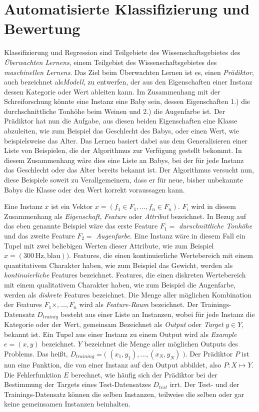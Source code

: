 \section{Automatisierte Klassifizierung und Bewertung}
\label{sec:learning}

Klassifizierung und Regression sind Teilgebiete des Wissenschaftsgebietes des \emph{Überwachten Lernens}, einem Teilgebiet des Wissenschaftsgebietes des \emph{maschinellen Lernens}. Das Ziel beim Überwachten Lernen ist es, einen \emph{Prädiktor}, auch bezeichnet als\emph{Modell}, zu entwerfen, der aus den Eigenschaften einer Instanz dessen Kategorie oder Wert ableiten kann. Im Zusammenhang mit der Schreiforschung könnte eine Instanz eine Baby sein, dessen Eigenschaften 1.) die durchschnittliche Tonhöhe beim Weinen und 2.) die Augenfarbe ist. Der Prädiktor hat nun die Aufgabe, aus diesen beiden Eigenschaften eine Klasse abzuleiten, wie zum Beispiel das Geschlecht des Babys, oder einen Wert, wie beispielsweise das Alter. Das Lernen basiert dabei aus dem Generalisieren einer Liste von Beispielen, die der Algorithmus zur Verfügung gestellt bekommt. In diesem Zusammenhang wäre dies eine Liste an Babys, bei der für jede Instanz das Geschlecht oder das Alter bereits bekannt ist. Der Algorithmus versucht nun, diese Beispiele soweit zu Verallgemeinern, dass er für neue, bisher unbekannte Babys die Klasse oder den Wert korrekt voraussagen kann.\cite[S. 6 - 7]{machine_marsland}

Eine Instanz $x$ ist ein Vektor $x = ( f_1 \in F_1 , \ldots , f_n \in F_n )$. $F_i$ wird in diesem Zusammenhang als \emph{Eigenschaft}, \emph{Feature} oder \emph{Attribut} bezeichnet. In Bezug auf das eben genannte Beispiel wäre das erste Feature $F_1 = $ \emph{durschnittliche Tonhöhe} und das zweite Feature $F_2 = $ \emph{Augenfarbe}. Eine Instanz wäre in diesem Fall ein Tupel mit zwei beliebigen Werten dieser Attribute, wie zum Beispiel $x = ( \SI{300}{\hertz}, \text{blau}) )$. Features, die einen kontinuierliche Wertebereich mit einem quantitativem Charakter haben, wie zum Beispiel das Gewicht, werden als \emph{kontinuierliche} Features bezeichnet. Features, die einen diskreten Wertebereich mit einem qualitativem Charakter haben, wie zum Beispiel die Augenfarbe, werden als \emph{diskrete} Features bezeichnet.  Die Menge aller möglichen Kombination der Features $F_1 \times , \ldots , F_n$ wird als \emph{Feature-Raum} bezeichnet. Der Trainings-Datensatz $D_{trainig}$ besteht aus einer Liste an Instanzen, wobei für jede Instanz die Kategorie oder der Wert, gemeinsam Bezeichnet als \emph{Output} oder \emph{Target} $y \in Y$, bekannt ist. Ein Tupel aus einer Instanz zu einem Output wird als \emph{Example} $e =(x,y)$ bezeichnet. $Y$ bezeichnet die Menge aller möglichen Outputs des Problems. Das heißt, $D_{training} = \big( \; (x_1, y_1), \ldots , (x_N, y_N) \; \big)$. Der Prädiktor $P$ ist nun eine Funktion, die von einer Instanz auf den Output abbildet, also $P: X \mapsto Y$. Die Fehlerfunktion $E$ berechnet, wie häufig sich der Prädiktor bei der Bestimmung der Targets eines Test-Datensatzes $D_{test}$ irrt. Der Test- und der Trainings-Datensatz können die selben Instanzen, teilweise die selben oder gar keine gemeinsamen Instanzen beinhalten.\cite[S. 6 - 7, 18 - 19]{machine_marsland} \cite[S. 8 - 9]{learning_cart_dobra} 


